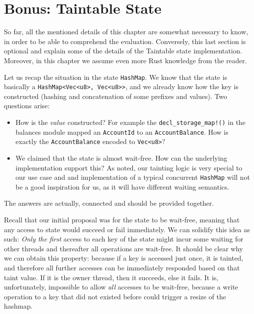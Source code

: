 \section{Bonus: Taintable State} \label{chap_impl:sec:bonus}

So far, all the mentioned details of this chapter are somewhat necessary to know, in order to be
able to comprehend the evaluation. Conversely, this last section is optional and explain some of the
details of the Taintable state implementation. Moreover, in this chapter we assume even more Rust
knowledge from the reader.

Let us recap the situation in the state \texttt{HashMap}. We know that the state is basically a
\texttt{HashMap<Vec<u8>, Vec<u8>>}, and we already know how the key is constructed (hashing and
concatenation of some prefixes and values). Two questions arise:

\begin{itemize}
	\item How is the \textit{value} constructed? For example the \texttt{decl\_storage\_map!()} in
	the balances module mapped an \texttt{AccountId} to an \texttt{AccountBalance}. How is exactly
	the \texttt{AccountBalance} encoded to \texttt{Vec<u8>}?
	\item We claimed that the state is almost wait-free. How can the underlying implementation
	support this? As noted, our tainting logic is very special to our use case and and
	implementation of a typical concurrent \texttt{HashMap} will not be a good inspiration for us,
	as it will have different waiting semantics.
\end{itemize}

The answers are actually, connected and should be provided together.

Recall that our initial proposal was for the state to be wait-free, meaning that any access to state
would succeed or fail immediately. We can solidify this idea as such: \textit{Only the first} access
to each key of the state might incur some waiting for other threads and thereafter all operations
are wait-free. It should be clear why we can obtain this property: because if a key is accessed just
once, it is tainted, and therefore all further accesses can be immediately responded based on that
taint value. If it is the owner thread, then it succeeds, else it fails. It is, unfortunately,
impossible to allow \textit{all} accesses to be wait-free, because a write operation to a key that
did not existed before could trigger a resize of the hashmap.


